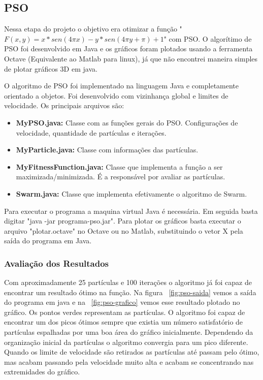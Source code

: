 \documentclass{acm_proc_article-sp}
\begin{document}
\subsection{PSO}
Nessa etapa do projeto o objetivo era otimizar a função "$\displaystyle F(x,y)=x * sen(4 \pi x) - y * sen(4 \pi y + \pi ) + 1$" com PSO. O algorítimo de PSO foi desenvolvido em Java e os gráficos foram plotados usando a ferramenta Octave \cite{octave} (Equivalente ao Matlab para linux), já que não encontrei maneira simples de plotar gráficos 3D em java.

O algoritmo de PSO foi implementado na linguagem Java e completamente orientado a objetos. Foi desenvolvido com vizinhança global e limites de velocidade. Os principais arquivos são:

\begin{itemize}
	\item \textbf{MyPSO.java:} Classe com as funções gerais do PSO. Configurações de velocidade, quantidade de partículas e iterações.
	\item \textbf{MyParticle.java:} Classe com informações das partículas.
	\item \textbf{MyFitnessFunction.java:} Classe que implementa a função a ser maximizada/minimizada. É a responsável por avaliar as partículas.
	\item \textbf{Swarm.java:} Classe que implementa efetivamente o algoritmo de Swarm.
\end{itemize}

Para executar o programa a maquina virtual Java é necessária. Em seguida basta digitar "java -jar programa-pso.jar". Para plotar os gráficos basta executar o arquivo "plotar.octave" no Octave ou no Matlab, substituindo o vetor X pela saída do programa em Java.

\subsubsection{Avaliação dos Resultados}

Com aproximadamente 25 partículas e 100 iterações o algoritmo já foi capaz de encontrar um resultado ótimo na função. Na figura ~\ref{fig:pso-saida} vemos a saída do programa em java e na ~\ref{fig:pso-grafico} vemos esse resultado plotado no gráfico. Os pontos verdes representam as partículas. O algoritmo foi capaz de encontrar um dos picos ótimos sempre que existia um número satisfatório de partículas espalhadas por uma boa área do gráfico inicialmente. Dependendo da organização inicial da partículas o algoritmo convergia para um pico diferente. Quando os limite de velocidade são retirados as partículas até passam pelo ótimo, mas acabam passando pela velocidade muito alta e acabam se concentrando nas extremidades do gráfico.
\end{document}
